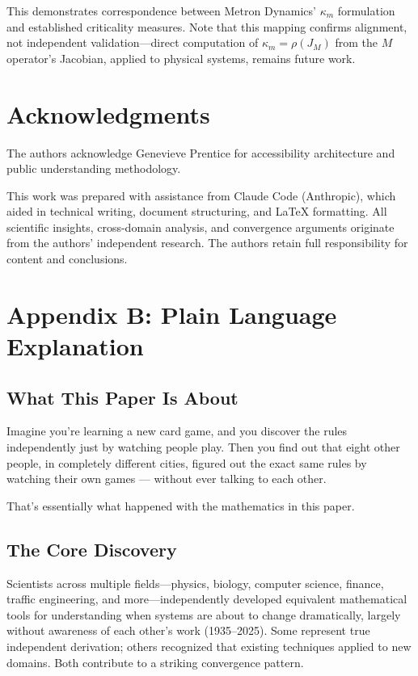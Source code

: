 \documentclass[11pt]{article}
\begin{document}
This demonstrates correspondence between Metron Dynamics' $\kappa_m$ formulation and established criticality measures. Note that this mapping confirms alignment, not independent validation---direct computation of $\kappa_m = \rho(J_M)$ from the $M$ operator's Jacobian, applied to physical systems, remains future work.

\section*{Acknowledgments}

The authors acknowledge Genevieve Prentice for accessibility architecture and public understanding methodology.

This work was prepared with assistance from Claude Code (Anthropic), which aided in technical writing, document structuring, and LaTeX formatting. All scientific insights, cross-domain analysis, and convergence arguments originate from the authors' independent research. The authors retain full responsibility for content and conclusions.

\newpage
\section*{Appendix B: Plain Language Explanation}

\subsection*{What This Paper Is About}

Imagine you're learning a new card game, and you discover the rules independently just by watching people play. Then you find out that eight other people, in completely different cities, figured out the exact same rules by watching their own games --- without ever talking to each other.

That's essentially what happened with the mathematics in this paper.

\subsection*{The Core Discovery}

Scientists across multiple fields---physics, biology, computer science, finance, traffic engineering, and more---independently developed equivalent mathematical tools for understanding when systems are about to change dramatically, largely without awareness of each other's work (1935--2025). Some represent true independent derivation; others recognized that existing techniques applied to new domains. Both contribute to a striking convergence pattern.
\end{document}
